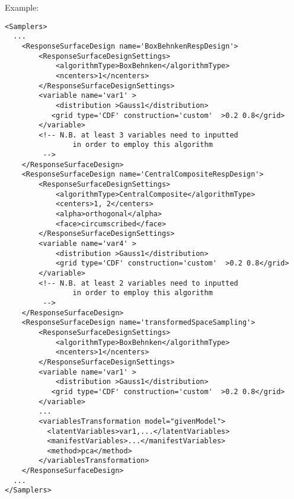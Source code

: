 

Example:
\begin{lstlisting}[style=XML,morekeywords={}]
<Samplers>
  ...
    <ResponseSurfaceDesign name='BoxBehnkenRespDesign'>
        <ResponseSurfaceDesignSettings>
            <algorithmType>BoxBehnken</algorithmType>
            <ncenters>1</ncenters>
        </ResponseSurfaceDesignSettings>
        <variable name='var1' >
            <distribution >Gauss1</distribution>
           <grid type='CDF' construction='custom'  >0.2 0.8</grid>
        </variable>
        <!-- N.B. at least 3 variables need to inputted
                in order to employ this algorithm
         -->
    </ResponseSurfaceDesign>
    <ResponseSurfaceDesign name='CentralCompositeRespDesign'>
        <ResponseSurfaceDesignSettings>
            <algorithmType>CentralComposite</algorithmType>
            <centers>1, 2</centers>
            <alpha>orthogonal</alpha>
            <face>circumscribed</face>
        </ResponseSurfaceDesignSettings>
        <variable name='var4' >
            <distribution >Gauss1</distribution>
            <grid type='CDF' construction='custom'  >0.2 0.8</grid>
        </variable>
        <!-- N.B. at least 2 variables need to inputted
                in order to employ this algorithm
         -->
    </ResponseSurfaceDesign>
    <ResponseSurfaceDesign name='transformedSpaceSampling'>
        <ResponseSurfaceDesignSettings>
            <algorithmType>BoxBehnken</algorithmType>
            <ncenters>1</ncenters>
        </ResponseSurfaceDesignSettings>
        <variable name='var1' >
            <distribution >Gauss1</distribution>
           <grid type='CDF' construction='custom'  >0.2 0.8</grid>
        </variable>
        ...
        <variablesTransformation model="givenModel">
          <latentVariables>var1,...</latentVariables>
          <manifestVariables>...</manifestVariables>
          <method>pca</method>
        </variablesTransformation>
    </ResponseSurfaceDesign>
  ...
</Samplers>
\end{lstlisting}

